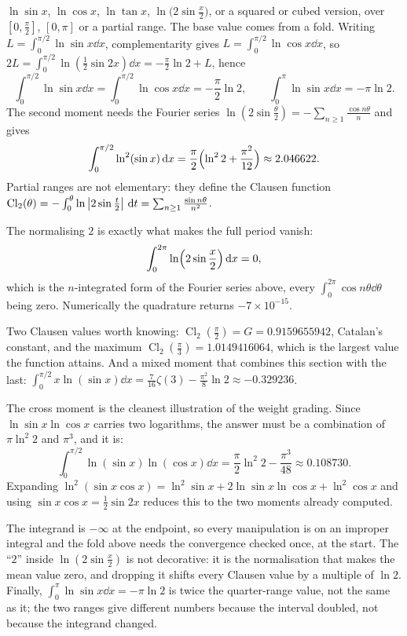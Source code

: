 \cue $\ln\sin x$, $\ln\cos x$, $\ln\tan x$, $\ln\bigl(2\sin\tfrac x2\bigr)$, or a squared or cubed version, over $[0,\tfrac\pi2]$, $[0,\pi]$ or a partial range.
\method The base value comes from a fold. Writing $L=\int_0^{\pi/2}\ln\sin x\dd x$, complementarity gives $L=\int_0^{\pi/2}\ln\cos x\dd x$, so $2L=\int_0^{\pi/2}\ln(\tfrac12\sin2x)\dd x=-\tfrac{\pi}{2}\ln2+L$, hence
\[\int_0^{\pi/2}\ln\sin x\dd x=\int_0^{\pi/2}\ln\cos x\dd x=-\frac{\pi}{2}\ln2,\qquad \int_0^{\pi}\ln\sin x\dd x=-\pi\ln2.\]
The second moment needs the Fourier series $\ln(2\sin\tfrac\theta2)=-\sum_{n\geq1}\frac{\cos n\theta}{n}$ and gives
\[\int_0^{\pi/2}\ln^{2}(\sin x)\,\mathrm{d} x=\frac{\pi}{2}\Bigl(\ln^{2}2+\frac{\pi^{2}}{12}\Bigr)\approx2.046622.\]
Partial ranges are not elementary: they define the Clausen function $\operatorname{Cl}_2(\theta)=-\int_0^{\theta}\ln\left\lvert 2\sin\tfrac t2\right\rvert\,\mathrm{d} t=\sum_{n\geq1}\frac{\sin n\theta}{n^{2}}$.

\begin{worked}
The normalising $2$ is exactly what makes the full period vanish:
\[\int_0^{2\pi}\ln\Bigl(2\sin\frac x2\Bigr)\,\mathrm{d} x=0,\]
which is the $n$-integrated form of the Fourier series above, every $\int_0^{2\pi}\cos n\theta\dd\theta$ being zero. Numerically the quadrature returns $-7\times10^{-15}$.

Two Clausen values worth knowing: $\operatorname{Cl}_2(\tfrac\pi2)=G=0.9159655942$, Catalan's constant, and the maximum $\operatorname{Cl}_2(\tfrac\pi3)=1.0149416064$, which is the largest value the function attains. And a mixed moment that combines this section with the last: $\int_0^{\pi/2}x\ln(\sin x)\dd x=\tfrac{7}{16}\zeta(3)-\tfrac{\pi^{2}}{8}\ln2\approx-0.329236$.

The cross moment is the cleanest illustration of the weight grading. Since $\ln\sin x\ln\cos x$ carries two logarithms, the answer must be a combination of $\pi\ln^{2}2$ and $\pi^{3}$, and it is:
\[\int_0^{\pi/2}\ln(\sin x)\ln(\cos x)\dd x=\frac{\pi}{2}\ln^{2}2-\frac{\pi^{3}}{48}\approx0.108730.\]
Expanding $\ln^{2}(\sin x\cos x)=\ln^{2}\sin x+2\ln\sin x\ln\cos x+\ln^{2}\cos x$ and using $\sin x\cos x=\tfrac12\sin2x$ reduces this to the two moments already computed.
\end{worked}

\begin{trap}
The integrand is $-\infty$ at the endpoint, so every manipulation is on an improper integral and the fold above needs the convergence checked once, at the start. The ``$2$'' inside $\ln(2\sin\tfrac x2)$ is not decorative: it is the normalisation that makes the mean value zero, and dropping it shifts every Clausen value by a multiple of $\ln2$. Finally, $\int_0^{\pi}\ln\sin x\dd x=-\pi\ln2$ is twice the quarter-range value, not the same as it; the two ranges give different numbers because the interval doubled, not because the integrand changed.
\end{trap}

